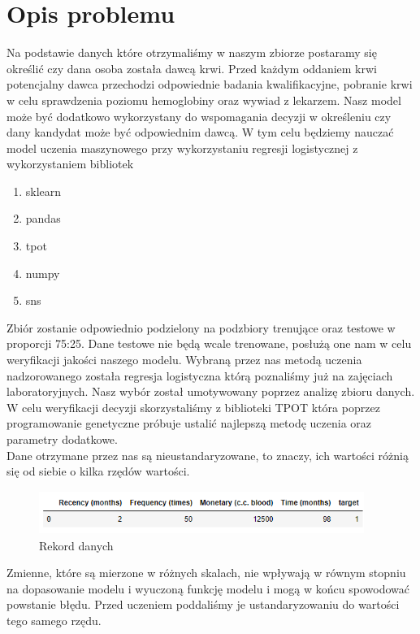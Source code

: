 \documentclass[11pt, a4paper, notitlepage]{report}
\begin{document}
\section{Opis problemu}
Na podstawie danych które otrzymaliśmy w naszym zbiorze postaramy się określić czy dana osoba została dawcą krwi. Przed każdym oddaniem krwi potencjalny dawca przechodzi odpowiednie badania kwalifikacyjne, pobranie krwi w celu sprawdzenia poziomu hemoglobiny oraz wywiad z lekarzem. Nasz model może być dodatkowo wykorzystany do wspomagania decyzji w określeniu czy dany kandydat może być odpowiednim dawcą. W tym celu będziemy nauczać model uczenia maszynowego przy wykorzystaniu regresji logistycznej z wykorzystaniem bibliotek 

\begin{enumerate}  
\item sklearn 
\item pandas
\item tpot
\item numpy
\item sns
\end{enumerate}

Zbiór zostanie odpowiednio podzielony na podzbiory trenujące oraz testowe w proporcji 75:25.
Dane testowe nie będą wcale trenowane, posłużą one nam w celu weryfikacji jakości naszego modelu. Wybraną przez nas metodą uczenia nadzorowanego została regresja logistyczna którą poznaliśmy już na zajęciach laboratoryjnych. Nasz wybór został umotywowany poprzez analizę zbioru danych. W celu weryfikacji decyzji skorzystaliśmy z biblioteki TPOT która poprzez programowanie genetyczne próbuje ustalić najlepszą metodę uczenia oraz parametry dodatkowe. \\
Dane otrzymane przez nas są nieustandaryzowane, to znaczy, ich wartości różnią się od siebie o kilka rzędów wartości. \\

\begin{figure}[h!]
  \includegraphics[width=300pt,height=40pt]{graphics/scale}
  \caption{Rekord danych}
  \label{fig:scale}
\end{figure}
Zmienne, które są mierzone w różnych skalach, nie wpływają w równym stopniu na dopasowanie modelu i wyuczoną funkcję modelu i mogą w końcu spowodować powstanie błędu. Przed uczeniem poddaliśmy je ustandaryzowaniu do wartości tego samego rzędu.
\end{document}
